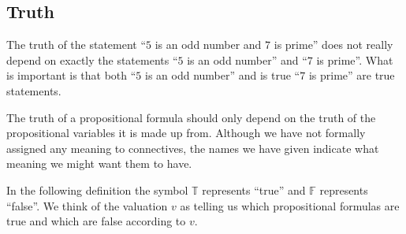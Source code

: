\documentclass[11pt]{article}
\newcommand{\PROP}{\mathrm{PROP}}
\newtheorem{definition}[theorem]{Definition}
\newcommand{\F}{\mathbb{F}}
\newcommand{\T}{\mathbb{T}}
\begin{document}
\subsection{Truth}\label{truth}
The truth of the statement ``$5$ is an odd number and $7$ is prime'' does not really depend on exactly the statements ``$5$ is an odd number'' and ``$7$ is prime''. What is important is that both ``$5$ is an odd number'' and is true ``$7$ is prime'' are true statements.

The truth of a propositional formula should only depend on the truth of the propositional variables it is made up from. Although we have not formally assigned any meaning to connectives, the names we have given indicate what meaning we might want them to have.

In the following definition the symbol $\T$ represents ``true'' and $\F$ represents ``false''. We think of the valuation $v$ as telling us which propositional formulas are true and which are false according to $v$.

%
%
%
%
%
%
%
%
%
%
%
%
\end{document}
